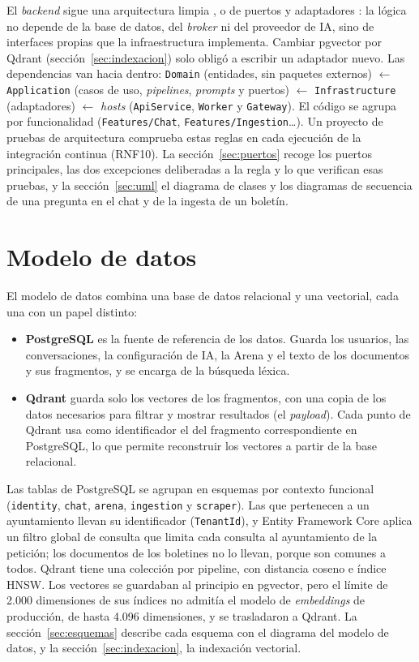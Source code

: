El \emph{backend} sigue una arquitectura limpia \cite{martin2017clean}, o de puertos y adaptadores \cite{cockburn2005hexagonal}: la lógica no depende de la base de datos, del \emph{broker} ni del proveedor de IA, sino de interfaces propias que la infraestructura implementa. Cambiar pgvector por Qdrant (sección~\ref{sec:indexacion}) solo obligó a escribir un adaptador nuevo. Las dependencias van hacia dentro: \texttt{Domain} (entidades, sin paquetes externos) $\leftarrow$ \texttt{Application} (casos de uso, \emph{pipelines}, \emph{prompts} y puertos) $\leftarrow$ \texttt{Infrastructure} (adaptadores) $\leftarrow$ \emph{hosts} (\texttt{ApiService}, \texttt{Worker} y \texttt{Gateway}). El código se agrupa por funcionalidad (\texttt{Features/Chat}, \texttt{Features/Ingestion}…). Un proyecto de pruebas de arquitectura comprueba estas reglas en cada ejecución de la integración continua (RNF10). La sección~\ref{sec:puertos} recoge los puertos principales, las dos excepciones deliberadas a la regla y lo que verifican esas pruebas, y la sección~\ref{sec:uml} el diagrama de clases y los diagramas de secuencia de una pregunta en el chat y de la ingesta de un boletín.

\section{Modelo de datos}
\label{sec:modelo-datos}

El modelo de datos combina una base de datos relacional y una vectorial, cada una con un papel distinto:

\begin{itemize}
  \item \textbf{PostgreSQL} es la fuente de referencia de los datos. Guarda los usuarios, las conversaciones, la configuración de IA, la Arena y el texto de los documentos y sus fragmentos, y se encarga de la búsqueda léxica.
  \item \textbf{Qdrant} guarda solo los vectores de los fragmentos, con una copia de los datos necesarios para filtrar y mostrar resultados (el \emph{payload}). Cada punto de Qdrant usa como identificador el del fragmento correspondiente en PostgreSQL, lo que permite reconstruir los vectores a partir de la base relacional.
\end{itemize}

Las tablas de PostgreSQL se agrupan en esquemas por contexto funcional (\texttt{identity}, \texttt{chat}, \texttt{arena}, \texttt{ingestion} y \texttt{scraper}). Las que pertenecen a un ayuntamiento llevan su identificador (\texttt{TenantId}), y Entity Framework Core aplica un filtro global de consulta que limita cada consulta al ayuntamiento de la petición; los documentos de los boletines no lo llevan, porque son comunes a todos. Qdrant tiene una colección por pipeline, con distancia coseno e índice HNSW. Los vectores se guardaban al principio en pgvector, pero el límite de 2.000 dimensiones de sus índices no admitía el modelo de \emph{embeddings} de producción, de hasta 4.096 dimensiones, y se trasladaron a Qdrant. La sección~\ref{sec:esquemas} describe cada esquema con el diagrama del modelo de datos, y la sección~\ref{sec:indexacion}, la indexación vectorial.

